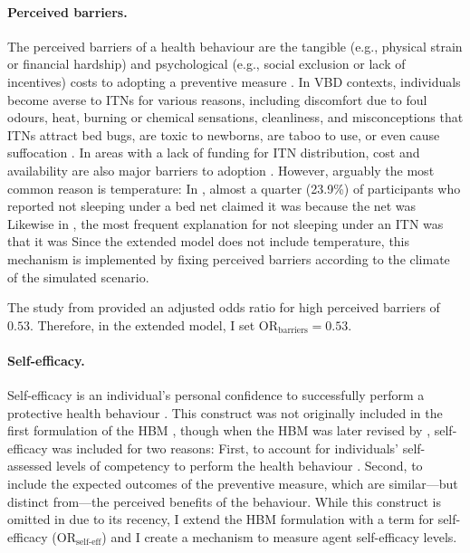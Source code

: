 \paragraph{Perceived barriers.}The perceived barriers of a health behaviour are the tangible (e.g., physical strain or financial hardship) and psychological (e.g., social exclusion or lack of incentives) costs to adopting a preventive measure \cite{champion_health_2015}. In VBD contexts, individuals become averse to ITNs for various reasons, including discomfort due to foul odours, heat, burning or chemical sensations, cleanliness, and misconceptions that ITNs attract bed bugs, are toxic to newborns, are taboo to use, or even cause suffocation \cite{mensah_individual_2020, manuv_investigating_2023, watanabe_determinants_2014, yirsaw_insecticide-treated_2021, naserrudin_role_2022}. In areas with a lack of funding for ITN distribution, cost and availability are also major barriers to adoption \cite{welch_barriers_2012}. However, arguably the most common reason is temperature: In \citet{kakaire_role_2023}, almost a quarter (23.9\%) of participants who reported not sleeping under a bed net claimed it was because the net was  Likewise in \citet{yirsaw_insecticide-treated_2021}, the most frequent explanation for not sleeping under an ITN was that it was  Since the extended model does not include temperature, this mechanism is implemented by fixing perceived barriers according to the climate of the simulated scenario.

The study from \citet{yirsaw_insecticide-treated_2021} provided an adjusted odds ratio for high perceived barriers of $0.53$. Therefore, in the extended model, I set $\text{OR}_{\text{barriers}}=0.53$.

\paragraph{Self-efficacy.}Self-efficacy is an individual's personal confidence to successfully perform a protective health behaviour \cite{bandura_self-efficacy_1997, champion_health_2015}. This construct was not originally included in the first formulation of the HBM \cite{hochbaum_public_1958}, though when the HBM was later revised by \citet{becker_health_1974}, self-efficacy was included for two reasons: First, to account for individuals' self-assessed levels of competency to perform the health behaviour \cite{bandura_self-efficacy_1997}. Second, to include the expected outcomes of the preventive measure, which are similar---but distinct from---the perceived benefits of the behaviour. While this construct is omitted in \citet{durham_incorporating_2012} due to its recency, I extend the HBM formulation with a term for self-efficacy ($\text{OR}_{\text{self-eff}}$) and I create a mechanism to measure agent self-efficacy levels.

